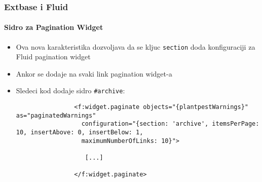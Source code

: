 \begin{frame}[fragile]
	\frametitle{Extbase i Fluid}
	\framesubtitle{Sidro za Pagination Widget}

	\lstset{basicstyle=\tiny\ttfamily}

	\begin{itemize}

		\item Ova nova karakteristika dozvoljava da se kljuc \texttt{section} doda konfiguraciji za Fluid pagination widget

		\item Ankor se dodaje na svaki link pagination widget-a

		\item Sledeci kod dodaje sidro \texttt{\#archive}:

			\begin{lstlisting}
				<f:widget.paginate objects="{plantpestWarnings}" as="paginatedWarnings"
				  configuration="{section: 'archive', itemsPerPage: 10, insertAbove: 0, insertBelow: 1,
				  maximumNumberOfLinks: 10}">

				   [...]

				</f:widget.paginate>
			\end{lstlisting}

	\end{itemize}

\end{frame}


